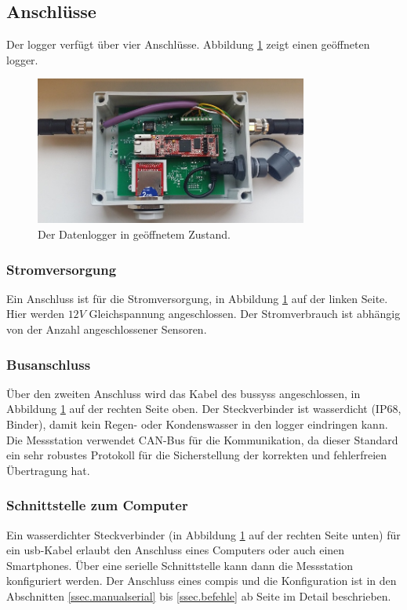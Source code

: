 \subsection{Anschlüsse}
Der \gls{logger} verfügt über vier Anschlüsse. Abbildung \ref{foto.logger} zeigt einen geöffneten \gls{logger}.

\begin{figure}
	\centering
		\includegraphics[width=0.8\textwidth]{images/fotos/datenlogger.png}
	\caption{Der Datenlogger in geöffnetem Zustand.}
	\label{foto.logger}
\end{figure}


\subsubsection{Stromversorgung}
Ein Anschluss ist für die Stromversorgung, in Abbildung \ref{foto.logger} auf der linken Seite. Hier werden \ensuremath{12 V} Gleichspannung angeschlossen. Der Stromverbrauch ist abhängig von der Anzahl angeschlossener Sensoren.


\subsubsection{Busanschluss}
Über den zweiten Anschluss wird das Kabel des \gls{bussys}s angeschlossen, in Abbildung \ref{foto.logger} auf der rechten Seite oben. Der Steckverbinder ist wasserdicht (IP68, Binder), damit kein Regen- oder Kondenswasser in den \gls{logger} eindringen kann. Die Messstation verwendet CAN-Bus für die Kommunikation, da dieser Standard ein sehr robustes Protokoll für die Sicherstellung der korrekten und fehlerfreien Übertragung hat. 

\subsubsection{Schnittstelle zum Computer}
Ein wasserdichter Steckverbinder (in Abbildung \ref{foto.logger} auf der rechten Seite unten) für ein \gls{usb}-Kabel erlaubt den Anschluss eines Computers oder auch einen Smartphones. Über eine serielle Schnittstelle kann dann die Messstation konfiguriert werden. Der Anschluss eines \gls{compi}s und die Konfiguration ist in den Abschnitten \ref{ssec.manualserial} bis \ref{ssec.befehle} ab Seite \pageref{ssec.manualserial} im Detail beschrieben.

